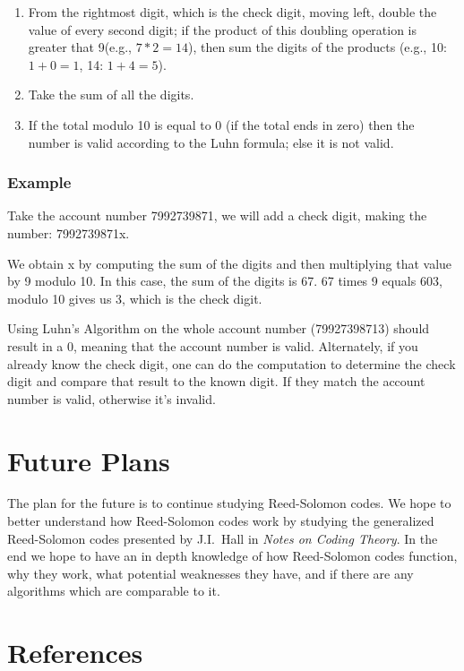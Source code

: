 \documentclass{article}
\begin{document}
\begin{enumerate}

\item From the rightmost digit, which is the check digit, moving left, double
the value of every second digit; if the product of this doubling operation is
greater that 9(e.g., $7*2=14$), then sum the digits of the products (e.g., 10: 
$1+0=1$, 14: $1+4=5$).

\item Take the sum of all the digits.

\item If the total modulo 10 is equal to 0 (if the total ends in zero) then the
number is valid according to the Luhn formula; else it is not valid.

\end{enumerate}

\subsubsection{Example}
Take the account number 7992739871, we will add a check digit, making the
number: 7992739871x.

We obtain x by computing the sum of the digits and then multiplying that value
by 9 modulo 10. In this case, the sum of the digits is 67. 67 times 9 equals
603, modulo 10 gives us 3, which is the check digit.

Using Luhn's Algorithm on the whole account number (79927398713) should result
in a 0, meaning that the account number is valid. Alternately,
if you already know the check digit, one can do the computation to determine
the check digit and compare that result to the known digit. If they match the
account number is valid, otherwise it's invalid.

\section{Future Plans}
The plan for the future is to continue studying Reed-Solomon codes. We hope to
better understand how Reed-Solomon codes work by studying the generalized Reed-Solomon
codes presented by J.I.~Hall in \textit{Notes on Coding Theory}. In the end we hope
to have an in depth knowledge of how Reed-Solomon codes function, why they work, what
potential weaknesses they have, and if there are any algorithms which are comparable to it.

\section{References}
\end{document}
